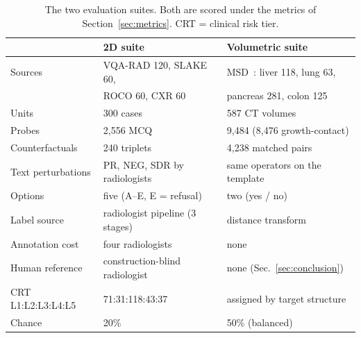 \begin{table}[!t]
\caption{The two evaluation suites. Both are scored under the metrics of
Section~\ref{sec:metrics}. CRT = clinical risk tier.}
\label{tab:suites}
\centering
\fontsize{7.2}{8.8}\selectfont
\setlength\tabcolsep{2pt}
\begin{tabular}{lll}
\toprule
  & 2D suite & Volumetric suite \\
\midrule
Sources & VQA-RAD 120, SLAKE 60, & MSD~\cite{antonelli2022msd}: liver 118, lung 63, \\
 & ROCO 60, CXR 60 & pancreas 281, colon 125 \\
Units & 300 cases & 587 CT volumes \\
Probes & 2{,}556 MCQ & 9{,}484 (8{,}476 growth-contact) \\
Counterfactuals & 240 triplets & 4{,}238 matched pairs \\
Text perturbations & PR, NEG, SDR by radiologists & same operators on the template \\
Options & five (A--E, E = refusal) & two (yes / no) \\
Label source & radiologist pipeline (3 stages) & distance transform \\
Annotation cost & four radiologists & none \\
Human reference & construction-blind radiologist & none (Sec.~\ref{sec:conclusion}) \\
CRT L1:L2:L3:L4:L5 & 71:31:118:43:37 & assigned by target structure \\
Chance & 20\% & 50\% (balanced) \\
\bottomrule
\end{tabular}
\end{table}

